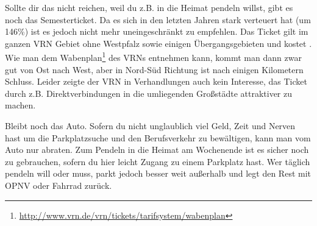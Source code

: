 Sollte dir das nicht reichen, weil du z.B. in die Heimat pendeln willst, gibt es noch das Semesterticket. Da es sich in den letzten Jahren stark verteuert hat (um 146\%) ist es jedoch nicht mehr uneingeschränkt zu empfehlen. Das Ticket gilt im ganzen VRN Gebiet ohne Westpfalz sowie einigen Übergangsgebieten und kostet \EUR{\semesterticket}. Wie man dem Wabenplan\footnote{\url{http://www.vrn.de/vrn/tickets/tarifsystem/wabenplan}} des \glspl{VRN} entnehmen kann, kommt man dann zwar gut von Ost nach West, aber in Nord-Süd Richtung ist nach einigen Kilometern Schluss. Leider zeigte der \gls{VRN} in Verhandlungen auch kein Interesse, das Ticket durch z.B. Direktverbindungen in die umliegenden Großstädte attraktiver zu machen.


Bleibt noch das Auto. Sofern du nicht unglaublich viel Geld, Zeit und Nerven hast um die Parkplatzsuche und den Berufsverkehr zu bewältigen, kann man vom Auto nur abraten. Zum Pendeln in die Heimat am Wochenende ist es sicher noch zu gebrauchen, sofern du hier leicht Zugang zu einem Parkplatz hast. Wer täglich pendeln will oder muss, parkt jedoch besser weit außerhalb und legt den Rest mit \gls{OPNV} oder Fahrrad zurück.
